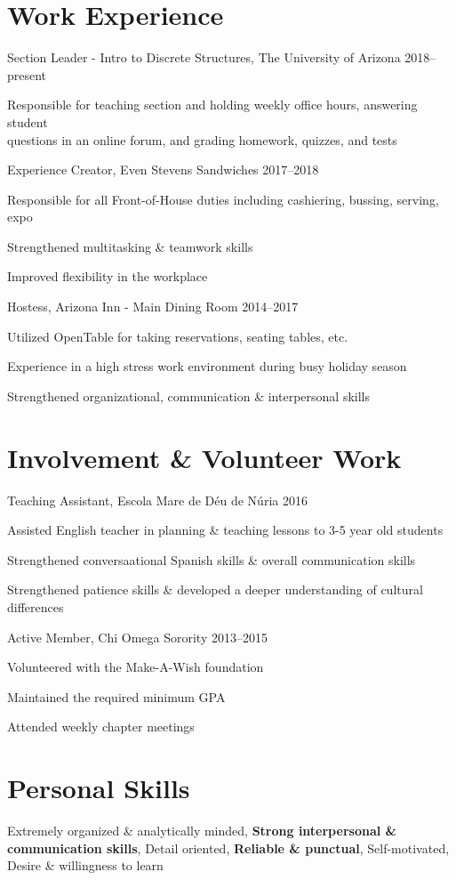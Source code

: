 \documentclass[]{friggeri-cv} %
\begin{document}
\section{Work Experience}
\begin{entrylist}

\entry%
{Section Leader - Intro to Discrete Structures{\normalfont , The University of Arizona}}%
{2018--present}
{%
	\item{Responsible for teaching section and holding weekly office hours, answering student \\ questions in an online forum, and grading homework, quizzes, and tests}
}
\entry
{Experience Creator{\normalfont , Even Stevens Sandwiches}}
{2017--2018}
{%
	\item{Responsible for all Front-of-House duties including cashiering, bussing, serving, expo}
	\item{Strengthened multitasking \& teamwork skills}
	\item{Improved flexibility in the workplace}
}
\entry
{Hostess{\normalfont , Arizona Inn - Main Dining Room}}
{2014--2017}
{%
		\item{Utilized OpenTable for taking reservations, seating tables, etc.}
		\item{Experience in a high stress work environment during busy holiday season}
		\item{Strengthened organizational, communication \& interpersonal skills}%
}


\end{entrylist}

\section{Involvement \& Volunteer Work}
\begin{entrylist}
\entry
{Teaching Assistant{\normalfont , Escola Mare de D\'{e}u de N\'{u}ria}}
{2016}
{
	\item{Assisted English teacher in planning \& teaching lessons to 3-5 year old students}
	\item{Strengthened conversaational Spanish skills \& overall communication skills}
	\item{Strengthened patience skills \& developed a deeper understanding of cultural differences}
}
\entry
{Active Member{\normalfont , Chi Omega Sorority}}
{2013--2015}
{
	\item{Volunteered with the Make-A-Wish foundation}
	\item{Maintained the required minimum GPA}
	\item{Attended weekly chapter meetings}
}
\end{entrylist}

\section{Personal Skills}
\begin{entrylist}
\lineentry
{}{}
{Extremely organized \& analytically minded, \textbf{Strong interpersonal \& communication skills},
Detail oriented, \textbf{Reliable \& punctual}, Self-motivated, Desire \& willingness to learn}
\end{entrylist}%
\end{document}

